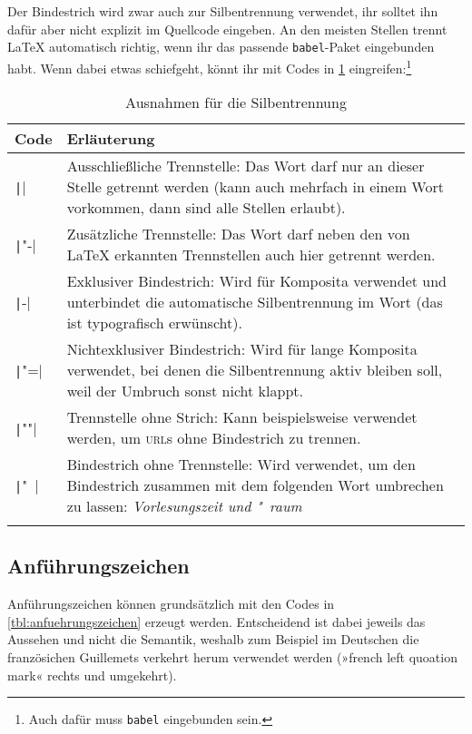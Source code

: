 Der Bindestrich wird zwar auch zur Silbentrennung verwendet, ihr solltet ihn dafür aber nicht explizit im Quellcode eingeben.
An den meisten Stellen trennt \LaTeX{} automatisch richtig, wenn ihr das passende \texttt{babel}-Paket eingebunden habt.
Wenn dabei etwas schiefgeht, könnt ihr mit Codes in \cref{tbl:trennstellen} eingreifen:\footnote{Auch dafür muss \texttt{babel} eingebunden sein.}

\begin{longtable}{@{}lp{11cm}@{}}
	\toprule
	Code      & Erläuterung \\
	\midrule
	\endhead
	\texttt|\-| & Ausschließliche Trennstelle: Das Wort darf nur an dieser Stelle getrennt werden (kann auch mehrfach in einem Wort vorkommen, dann sind alle Stellen erlaubt). \\
	\texttt|"-| & Zusätzliche Trennstelle: Das Wort darf neben den von \LaTeX{} erkannten Trennstellen auch hier getrennt werden. \\
	\texttt|-|  & Exklusiver Bindestrich: Wird für Komposita verwendet und unterbindet die automatische Silbentrennung im Wort (das ist typografisch erwünscht). \\
	\texttt|"=| & Nichtexklusiver Bindestrich: Wird für lange Komposita verwendet, bei denen die Silbentrennung aktiv bleiben soll, weil der Umbruch sonst nicht klappt. \\
	\texttt|""| & Trennstelle ohne Strich: Kann beispielsweise verwendet werden, um \textsc{url}s ohne Bindestrich zu trennen. \\
	\texttt|"~| & Bindestrich ohne Trennstelle: Wird verwendet, um den Bindestrich zusammen mit dem folgenden Wort umbrechen zu lassen: \emph{Vorlesungszeit und "~raum} \\
	\bottomrule
	\caption{Ausnahmen für die Silbentrennung}
	\label{tbl:trennstellen}
\end{longtable}

\subsection{Anführungszeichen}
Anführungszeichen können grundsätzlich mit den Codes in \cref{tbl:anfuehrungszeichen} erzeugt werden.
Entscheidend ist dabei jeweils das Aussehen und nicht die Semantik, weshalb zum Beispiel im Deutschen die französichen Guillemets verkehrt herum verwendet werden (»french left quoation mark« rechts und umgekehrt).


